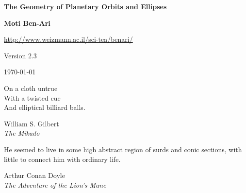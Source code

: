 


\thispagestyle{empty}

\begin{center}
\textbf{\LARGE The Geometry of Planetary Orbits and Ellipses}

\bigskip
\bigskip
\bigskip

\textbf{\Large Moti Ben-Ari}

\bigskip

\url{http://www.weizmann.ac.il/sci-tea/benari/}

\bigskip

Version 2.3

\bigskip

\today

\end{center}

\vspace*{10ex}

\hfill\begin{minipage}{.4\textwidth}
\small On a cloth untrue\\With a twisted cue\\And elliptical billiard balls.
\begin{flushright}
William S. Gilbert\\\textit{The Mikado}
\end{flushright}
\end{minipage}

\vspace*{4ex}


\hfill\begin{minipage}{.4\textwidth}
\small He seemed to live in some high abstract region of surds and conic sections, with little to connect him with ordinary life.
\begin{flushright}
Arthur Conan Doyle\\\textit{The Adventure of the Lion’s Mane}
\end{flushright}
\end{minipage}



